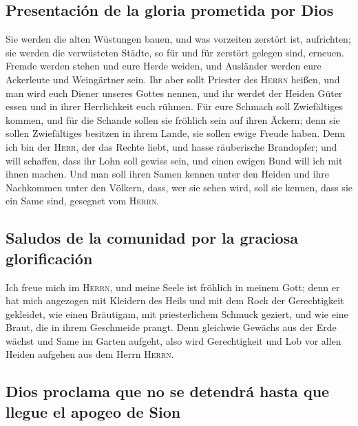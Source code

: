 \hypertarget{presentaciuxf3n-de-la-gloria-prometida-por-dios}{%
\subsection{Presentación de la gloria prometida por
Dios}\label{presentaciuxf3n-de-la-gloria-prometida-por-dios}}

 Sie werden die alten Wüstungen bauen, und was vorzeiten
zerstört ist, aufrichten; sie werden die verwüsteten Städte, so für und
für zerstört gelegen sind, erneuen.  Fremde werden stehen
und eure Herde weiden, und Ausländer werden eure Ackerleute und
Weingärtner sein.  Ihr aber sollt Priester des
\textsc{Herrn} heißen, und man wird euch Diener unseres Gottes nennen,
und ihr werdet der Heiden Güter essen und in ihrer Herrlichkeit euch
rühmen.  Für eure Schmach soll Zwiefältiges kommen, und
für die Schande sollen sie fröhlich sein auf ihren Äckern; denn sie
sollen Zwiefältiges besitzen in ihrem Lande, sie sollen ewige Freude
haben.  Denn ich bin der \textsc{Herr}, der das Rechte
liebt, und hasse räuberische Brandopfer; und will schaffen, dass ihr
Lohn soll gewiss sein, und einen ewigen Bund will ich mit ihnen machen.
 Und man soll ihren Samen kennen unter den Heiden und ihre
Nachkommen unter den Völkern, dass, wer sie sehen wird, soll sie kennen,
dass sie ein Same sind, gesegnet vom \textsc{Herrn}.

\hypertarget{saludos-de-la-comunidad-por-la-graciosa-glorificaciuxf3n}{%
\subsection{Saludos de la comunidad por la graciosa
glorificación}\label{saludos-de-la-comunidad-por-la-graciosa-glorificaciuxf3n}}

 Ich freue mich im \textsc{Herrn}, und meine Seele ist
fröhlich in meinem Gott; denn er hat mich angezogen mit Kleidern des
Heils und mit dem Rock der Gerechtigkeit gekleidet, wie einen Bräutigam,
mit priesterlichem Schmuck geziert, und wie eine Braut, die in ihrem
Geschmeide prangt.  Denn gleichwie Gewächs aus der Erde
wächst und Same im Garten aufgeht, also wird Gerechtigkeit und Lob vor
allen Heiden aufgehen aus dem Herrn \textsc{Herrn}.

\hypertarget{dios-proclama-que-no-se-detendruxe1-hasta-que-llegue-el-apogeo-de-sion}{%
\subsection{Dios proclama que no se detendrá hasta que llegue el apogeo
de
Sion}\label{dios-proclama-que-no-se-detendruxe1-hasta-que-llegue-el-apogeo-de-sion}}


